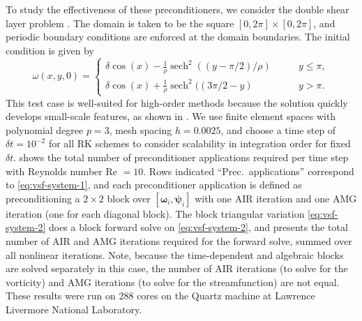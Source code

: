 \documentclass[review]{siamart}
\begin{document}
To study the effectiveness of these preconditioners, we consider the double shear layer problem \cite{Bell1989}.
The domain is taken to be the square $[0,2\pi] \times [0,2\pi]$, and periodic boundary conditions are enforced at the domain boundaries.
The initial condition is given by
\[
	\omega(x,y,0) = \begin{cases}
		\delta \cos(x) - \frac{1}{\rho}\operatorname{sech}^2((y-\pi/2)/\rho) \qquad & y \leq \pi, \\
		\delta \cos(x) + \frac{1}{\rho}\operatorname{sech}^2((3\pi/2 - y) \qquad & y > \pi.
	\end{cases}
\]
This test case is well-suited for high-order methods because the solution quickly develops small-scale features, as shown in .
We use finite element spaces with polynomial degree $p=3$, mesh spacing $h = 0.0025$, and choose a time step of $\delta t = 10^{-2}$ for all RK schemes to consider scalability in integration order for fixed $\delta t$.
 shows the total number of preconditioner applications required per time step with Reynolds number Re  $=10$. Rows indicated ``Prec.\ applications'' correspond to \eqref{eq:vsf-system-1}, and each preconditioner application is defined as preconditioning a $2\times 2$ block over $[\boldsymbol{\omega}_i,\boldsymbol{\psi}_i]$ with {one} AIR iteration and one AMG iteration (one for each diagonal block). The block triangular variation \eqref{eq:vsf-system-2} does a block forward solve on \eqref{eq:vsf-system-2}, and  presents the total number of AIR and AMG iterations required for the forward solve, summed over all nonlinear iterations.
Note, because the time-dependent and algebraic blocks are solved separately in this case, the number of AIR iterations (to solve for the vorticity) and AMG iterations (to solve for the streamfunction) are not equal. These results were run on 288 cores on the Quartz machine at Lawrence Livermore National Laboratory.
\end{document}
